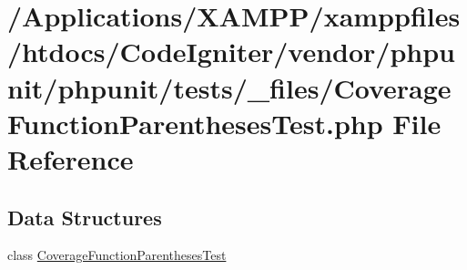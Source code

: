 \hypertarget{phpunit_2tests_2__files_2_coverage_function_parentheses_test_8php}{}\section{/\+Applications/\+X\+A\+M\+P\+P/xamppfiles/htdocs/\+Code\+Igniter/vendor/phpunit/phpunit/tests/\+\_\+files/\+Coverage\+Function\+Parentheses\+Test.php File Reference}
\label{phpunit_2tests_2__files_2_coverage_function_parentheses_test_8php}
\subsection*{Data Structures}
\begin{DoxyCompactItemize}
\item 
class \mbox{\hyperlink{class_coverage_function_parentheses_test}{Coverage\+Function\+Parentheses\+Test}}
\end{DoxyCompactItemize}
